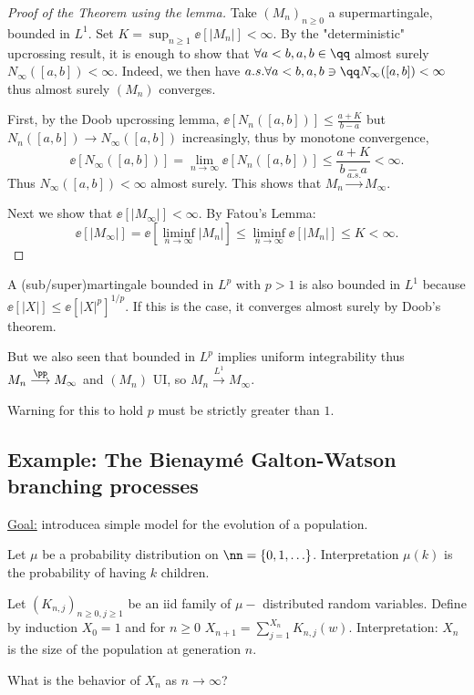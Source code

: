 \documentclass[../main.tex]{subfiles}
\begin{document}
\begin{proof}
  [Proof of the Theorem using the lemma]
  Take $(M_n)_{n \geq 0}$ a supermartingale, bounded in $L^1$. Set $K = \sup_{n
  \geq 1} \ee[|M_n|] < \infty$. By the "deterministic" upcrossing result, it is
  enough to show that $\forall a < b, a, b \in \qq$ almost surely
  $N_{\infty}([a, b])<\infty$. Indeed, we then have $a.s. \forall a < b, a, b
  \ni \qq N_{\infty}([a, b]) < \infty$ thus almost surely $(M_n)$ converges.

  First, by the Doob upcrossing lemma, $\ee[N_n([a, b])] \leq \frac{a + K}{b -a}
  $ but $N_n([a, b]) \to N_{\infty}([a, b])$ increasingly, thus by monotone
  convergence, 
  \[
    \ee[N_{\infty}([a, b])] = \lim_{n \to \infty} \ee[N_{n}([a, b])] \leq
    \frac{a + K}{b - a} < \infty
  .\] 
Thus $N_{\infty}([a, b]) < \infty$ almost surely. This shows that $M_n
  \overset{a.s.}{\longrightarrow} M_{\infty}$.

  Next we show that $\ee[|M_{\infty}|] < \infty$. By Fatou's Lemma:
  \[
    \ee[|M_{\infty}|] = \ee[\liminf_{n \to \infty} |M_n|] \leq \liminf_{n \to
    \infty}\ee[|M_n|] \leq K < \infty
  .\] 
\end{proof} 

\begin{remark}
    A (sub/super)martingale bounded in $L^p$ with $p > 1$ is also bounded in
    $L^1$ because $\ee[|X|] \leq \ee[|X|^p]^{1/p}$. If this is the case, it
    converges almost surely by Doob's theorem. 

    But we also seen that bounded in $L^p$ implies uniform integrability thus 
    $M_n \overset{\pp}{\longrightarrow} M_{\infty}$ and $(M_n)$ UI, so $M_n
    \overset{L^1}{\longrightarrow} M_{\infty}$.

    {\color{red} Warning} for this to hold $p$ must be strictly greater than
    $1$.
\end{remark}

\subsection{Example: The Bienaymé Galton-Watson branching processes}

\underline{Goal:} introducea simple model for the evolution of a population.

Let $\mu$ be a probability distribution on $\nn = \{ 0, 1, \ldots \} $.
Interpretation $\mu(k)$ is the probability of having $k$ children.

Let $(K_{n, j})_{n \geq 0, j \geq 1}$ be an iid family of $\mu-$ distributed
random variables. Define by induction $X_0 = 1$ and for $n \geq 0$ $X_{n+1} =
\sum_{j=1}^{X_n} K_{n, j}(w)$. Interpretation: $X_n$ is the size of the
population at generation $n$.

\begin{question}
    What is the behavior of $X_n$ as $n \to \infty$?
\end{question}
\end{document}
